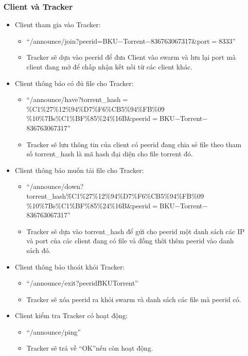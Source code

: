 \documentclass[a4paper]{article}
\begin{document}
    \subsubsection{Client và Tracker}
    \begin{itemize}
        \item Client tham gia vào Tracker:
        \begin{itemize}
            \item \textquotedblleft/announce/join$?$peerid=BKU$-$Torrent$-$836763067317\&port$=$8333\textquotedblright
            \item Tracker sẽ dựa vào peerid để đưa Client vào swarm và lưu lại port mà client đang mở để chấp nhận kết nối từ các client khác.
        \end{itemize}
        \item Client thông báo có đủ file cho Tracker:
        \begin{itemize}
            \item \textquotedblleft/announce/have?torrent\_hash$=$\%C1\%27\%12\%94\%D7\%F6\%CB5\%94\%FB\%09 \%10\%7Bs\%C1\%BF\%85\%24\%16B\&peerid$=$BKU$-$Torrent$-$836763067317\textquotedblright
            \item Tracker sẽ lưu thông tin của client có peerid đang chia sẻ file theo tham số torrent\_hash là mã hash đại diện cho file torrent đó.
        \end{itemize}
        \item Client thông báo muốn tải file cho Tracker:
        \begin{itemize}
            \item \textquotedblleft/announce/down?torrent\_hash\=\%C1\%27\%12\%94\%D7\%F6\%CB5\%94\%FB\%09 \%10\%7Bs\%C1\%BF\%85\%24\%16B\&peerid$=$BKU$-$Torrent$-$836763067317\textquotedblright
            \item Tracker sẽ dựa vào torrent\_hash để gửi cho peerid một danh sách các IP và port của các client đang có file và đồng thời thêm peerid vào danh sách đó.
        \end{itemize}
        \item Client thông báo thoát khỏi Tracker:
        \begin{itemize}
            \item \textquotedblleft/announce/exit?peerid\=BKU\-Torrent\textquotedblright
            \item Tracker sẽ xóa peerid ra khỏi swarm và danh sách các file mà peerid có.
        \end{itemize}
        \item Client kiểm tra Tracker có hoạt động:
        \begin{itemize}
            \item \textquotedblleft/announce/ping\textquotedblright
            \item Tracker sẽ trả về \textquotedblleft OK\textquotedblright nếu còn hoạt động.
        \end{itemize}
    \end{itemize}
\end{document}
